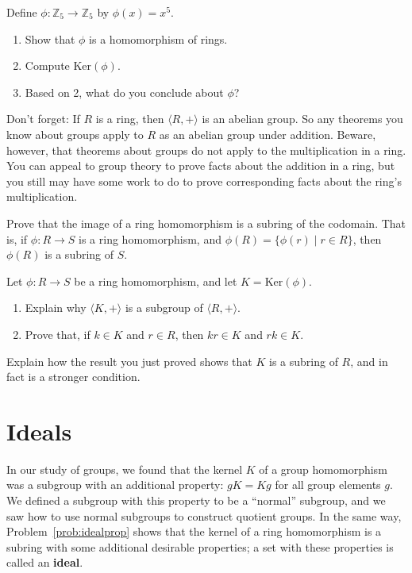 \begin{problem}
Define \(\phi:\mathbb{Z}_5\longrightarrow \mathbb{Z}_5\) by \(\phi(x)=x^5\).
\begin{enumerate}
  \item Show that \(\phi\) is a homomorphism of rings.
  \item Compute \(\mbox{Ker}(\phi)\).
  \item Based on 2, what do you conclude about \(\phi\)?
\end{enumerate}
\end{problem}

Don't forget: If \(R\) is a ring, then \(\langle R, +\rangle\) is an abelian group. So any theorems you know about groups apply to \(R\) as an abelian group under addition. Beware, however, that theorems about groups do not apply to the multiplication in a ring. You can appeal to group theory to prove facts about the addition in a ring, but you still may have some work to do to prove corresponding facts about the ring's multiplication.

\begin{problem}
Prove that the image of a ring homomorphism is a subring of the codomain. That is, if \(\phi: R \longrightarrow S\) is a ring homomorphism, and \(\phi(R) = \{\phi(r) \mid r\in R\}\), then \(\phi(R)\) is a subring of \(S\).
\end{problem}

\begin{problem}\label{prob:idealprop}
Let \(\phi: R \longrightarrow S\) be a ring homomorphism, and let \(K = \mbox{Ker}(\phi)\).
\begin{enumerate}
  \item Explain why \(\langle K, + \rangle\) is a subgroup of \(\langle R, +\rangle \).
  \item Prove that, if \(k\in K\) and \(r \in R\), then \(kr \in K\) and \(rk \in K\).
\end{enumerate}
Explain how the result you just proved shows that \(K\) is a subring of \(R\), and in fact is a stronger condition.
\end{problem}

\section{Ideals}
In our study of groups, we found that the kernel \(K\) of a group homomorphism was a subgroup with an additional property: \(gK = Kg\) for all group elements \(g\). We defined a subgroup with this property to be a ``normal'' subgroup, and we saw how to use normal subgroups to construct quotient groups. In the same way, Problem~\ref{prob:idealprop} shows that the kernel of a ring homomorphism is a subring with some additional desirable properties; a set with these properties is called an \textbf{ideal}.


